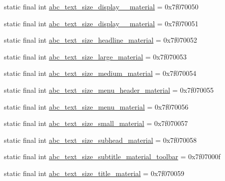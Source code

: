 \begin{CompactItemize}
\item 
static final int \hyperlink{classandroid_1_1support_1_1graphics_1_1drawable_1_1animated_1_1_r_1_1dimen_4368af3af20e13390bae73027ea5d437}{abc\_\-text\_\-size\_\-display\_\_\-material} = 0x7f070050
\item 
static final int \hyperlink{classandroid_1_1support_1_1graphics_1_1drawable_1_1animated_1_1_r_1_1dimen_4c4b08364103433f165d3da29296c490}{abc\_\-text\_\-size\_\-display\_\_\-material} = 0x7f070051
\item 
static final int \hyperlink{classandroid_1_1support_1_1graphics_1_1drawable_1_1animated_1_1_r_1_1dimen_dfd883bf6c0eed62bd9be6af000ce0a5}{abc\_\-text\_\-size\_\-headline\_\-material} = 0x7f070052
\item 
static final int \hyperlink{classandroid_1_1support_1_1graphics_1_1drawable_1_1animated_1_1_r_1_1dimen_9c0ccf5b31517d9f8a095cf21ec90e1e}{abc\_\-text\_\-size\_\-large\_\-material} = 0x7f070053
\item 
static final int \hyperlink{classandroid_1_1support_1_1graphics_1_1drawable_1_1animated_1_1_r_1_1dimen_a5d88fdf1c5189a212261203cb95971a}{abc\_\-text\_\-size\_\-medium\_\-material} = 0x7f070054
\item 
static final int \hyperlink{classandroid_1_1support_1_1graphics_1_1drawable_1_1animated_1_1_r_1_1dimen_497e489eb32278dff47f64cad9f547fe}{abc\_\-text\_\-size\_\-menu\_\-header\_\-material} = 0x7f070055
\item 
static final int \hyperlink{classandroid_1_1support_1_1graphics_1_1drawable_1_1animated_1_1_r_1_1dimen_573acfc3902ae66f7816f463a8725b8f}{abc\_\-text\_\-size\_\-menu\_\-material} = 0x7f070056
\item 
static final int \hyperlink{classandroid_1_1support_1_1graphics_1_1drawable_1_1animated_1_1_r_1_1dimen_1b9173ac6c4c835bf228dc15bf8d3d55}{abc\_\-text\_\-size\_\-small\_\-material} = 0x7f070057
\item 
static final int \hyperlink{classandroid_1_1support_1_1graphics_1_1drawable_1_1animated_1_1_r_1_1dimen_2268dc46b91cac105f11dad0d0872b4e}{abc\_\-text\_\-size\_\-subhead\_\-material} = 0x7f070058
\item 
static final int \hyperlink{classandroid_1_1support_1_1graphics_1_1drawable_1_1animated_1_1_r_1_1dimen_ef70460d6ba546c8a1196fd9425fcb7f}{abc\_\-text\_\-size\_\-subtitle\_\-material\_\-toolbar} = 0x7f07000f
\item 
static final int \hyperlink{classandroid_1_1support_1_1graphics_1_1drawable_1_1animated_1_1_r_1_1dimen_2a16d314cb6fe5ae3ad6921f8f6f1ce4}{abc\_\-text\_\-size\_\-title\_\-material} = 0x7f070059

\end{CompactItemize}
